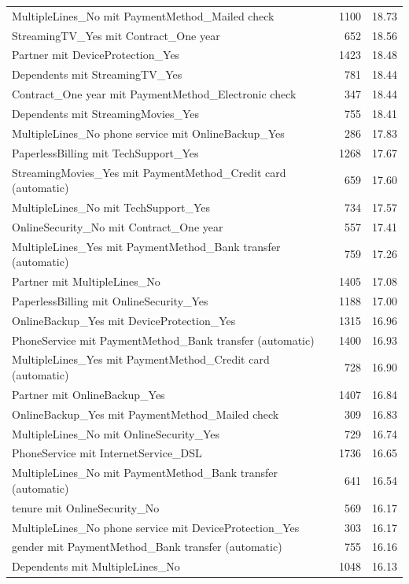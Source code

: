 \documentclass[a4paper,11pt]{article}
\begin{document}
\begin{longtable}{p{9cm}rr}
MultipleLines\_No mit PaymentMethod\_Mailed check & 1100 & 18.73 \\
StreamingTV\_Yes mit Contract\_One year & 652 & 18.56 \\
Partner mit DeviceProtection\_Yes & 1423 & 18.48 \\
Dependents mit StreamingTV\_Yes & 781 & 18.44 \\
Contract\_One year mit PaymentMethod\_Electronic check & 347 & 18.44 \\
Dependents mit StreamingMovies\_Yes & 755 & 18.41 \\
MultipleLines\_No phone service mit OnlineBackup\_Yes & 286 & 17.83 \\
PaperlessBilling mit TechSupport\_Yes & 1268 & 17.67 \\
StreamingMovies\_Yes mit PaymentMethod\_Credit card (automatic) & 659 & 17.60 \\
MultipleLines\_No mit TechSupport\_Yes & 734 & 17.57 \\
OnlineSecurity\_No mit Contract\_One year & 557 & 17.41 \\
MultipleLines\_Yes mit PaymentMethod\_Bank transfer (automatic) & 759 & 17.26 \\
Partner mit MultipleLines\_No & 1405 & 17.08 \\
PaperlessBilling mit OnlineSecurity\_Yes & 1188 & 17.00 \\
OnlineBackup\_Yes mit DeviceProtection\_Yes & 1315 & 16.96 \\
PhoneService mit PaymentMethod\_Bank transfer (automatic) & 1400 & 16.93 \\
MultipleLines\_Yes mit PaymentMethod\_Credit card (automatic) & 728 & 16.90 \\
Partner mit OnlineBackup\_Yes & 1407 & 16.84 \\
OnlineBackup\_Yes mit PaymentMethod\_Mailed check & 309 & 16.83 \\
MultipleLines\_No mit OnlineSecurity\_Yes & 729 & 16.74 \\
PhoneService mit InternetService\_DSL & 1736 & 16.65 \\
MultipleLines\_No mit PaymentMethod\_Bank transfer (automatic) & 641 & 16.54 \\
tenure mit OnlineSecurity\_No & 569 & 16.17 \\
MultipleLines\_No phone service mit DeviceProtection\_Yes & 303 & 16.17 \\
gender mit PaymentMethod\_Bank transfer (automatic) & 755 & 16.16 \\
Dependents mit MultipleLines\_No & 1048 & 16.13 \\

\end{longtable}
\end{document}
